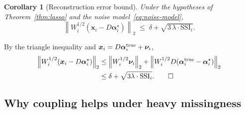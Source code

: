 \documentclass[journal,onecolumn,11pt]{IEEEtran}
\newtheorem{corollary}[theorem]{Corollary}
\theoremstyle{definition}
\newcommand{\norm}[1]{\left\lVert #1 \right\rVert}
\newcommand{\xvec}{\bm{x}}
\newcommand{\alphavec}{\bm{\alpha}}
\begin{document}
\begin{corollary}[Reconstruction error bound]
\label{cor:recon}
Under the hypotheses of Theorem~\ref{thm:lasso} and the noise
model~\eqref{eq:noise-model},
\begin{equation}
\norm{W_i^{1/2}(\xvec_i-D\alphavec_i^\star)}_2
\;\le\;
\delta + \sqrt{3\,\lambda\cdot\mathrm{SSI}_i}.
\label{eq:recon-bound}
\end{equation}
\end{corollary}
\begin{IEEEproof}
By the triangle inequality and $\xvec_i=D\alphavec_i^{\rm true}+\bm{\nu}_i$,
\begin{align*}
\norm{W_i^{1/2}(\xvec_i-D\alphavec_i^\star)}_2
&\le \norm{W_i^{1/2}\bm{\nu}_i}_2+\norm{W_i^{1/2}D(\alphavec_i^{\rm true}-\alphavec_i^\star)}_2\\
&\le \delta + \sqrt{3\lambda\cdot\mathrm{SSI}_i}.
\qedhere
\end{align*}
\end{IEEEproof}

\subsection{Why coupling helps under heavy missingness}
\label{sec:variance}
\end{document}
